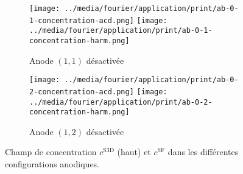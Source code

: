 \begin{figure}[h]
  \begin{center}
    \begin{subfigure}[t]{\textwidth}
      \begin{center}
        \texttt{[image: ../media/fourier/application/print/ab-0-1-concentration-acd.png]}
        \texttt{[image: ../media/fourier/application/print/ab-0-1-concentration-harm.png]}
        \caption{Anode $(1,1)$ désactivée}
        \label{fig:}
      \end{center}
    \end{subfigure}

    \begin{subfigure}[t]{\textwidth}
      \begin{center}
        \texttt{[image: ../media/fourier/application/print/ab-0-2-concentration-acd.png]}
        \texttt{[image: ../media/fourier/application/print/ab-0-2-concentration-harm.png]}
        \caption{Anode $(1,2)$ désactivée}
        \label{fig:}
      \end{center}
    \end{subfigure}


    \caption{Champ de concentration $c^\mathrm{S3D}$ (haut) et
      $c^\mathrm{SF}$ dans les différentes configurations anodiques.}

    \label{fig:harmonic-concentration-comp-a}
  \end{center}
\end{figure}


